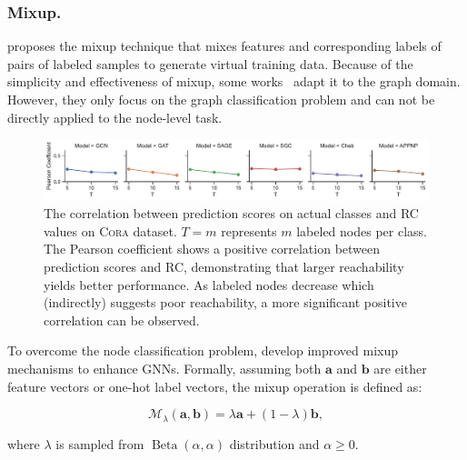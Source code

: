 \documentclass[letterpaper]{article} %
\newcommand{\aVec}[1]{\mathbf{#1}}
\DeclareMathOperator{\betadist}{Beta}
\begin{document}
\subsubsection{Mixup.}
\cite{mixup} proposes the mixup technique that mixes features and corresponding labels of pairs of labeled samples to generate virtual training data. Because of the simplicity and effectiveness of mixup, some works~\cite{mixup_metric_g,mixup_transplant_g,ifmixup_g,graphmad_g} adapt it to the graph domain. However, they only focus on the graph classification problem and can not be directly applied to the node-level task. 
\begin{figure}[!htbp]
	\centering
    \includegraphics[width=1\linewidth]{figs/pearson_cora.pdf}
    \caption{The correlation between prediction scores on actual classes and RC values on \textsc{Cora} dataset. $T = m$ represents $m$ labeled nodes per class. The Pearson coefficient shows a positive correlation between prediction scores and RC, demonstrating that larger reachability yields better performance. As labeled nodes decrease which (indirectly) suggests poor reachability, a more significant positive correlation can be observed.}
    \label{fig:pearson}
\end{figure}
To overcome the node classification problem, \cite{graphmixup,mixup_for_node,graphmix} develop improved mixup mechanisms to enhance GNNs. Formally, assuming both $\aVec{a}$ and $\aVec{b}$ are either feature vectors or one-hot label vectors, the mixup operation is defined as:
\begin{small}
	\begin{equation}
	\label{eq:mixup}
	\mathcal{M}_{\lambda}(\aVec{a}, \aVec{b}) = \lambda \aVec{a} + (1-\lambda) \aVec{b},
	\end{equation}
\end{small}where $\lambda$ is sampled from $\betadist(\alpha, \alpha)$ distribution and $\alpha \geq 0$. 
\end{document}

